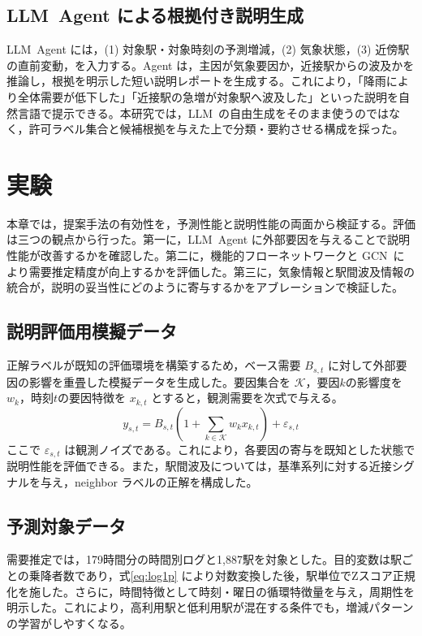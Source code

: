 \documentclass[technicalreport]{ieicej}
\newcommand{\LLM}{LLM}
\newcommand{\GCN}{GCN}
\begin{document}
\subsection{\LLM\ Agent による根拠付き説明生成}
\LLM\ Agent には，(1) 対象駅・対象時刻の予測増減，(2) 気象状態，(3) 近傍駅の直前変動，を入力する。Agent は，主因が気象要因か，近接駅からの波及かを推論し，根拠を明示した短い説明レポートを生成する。これにより，「降雨により全体需要が低下した」「近接駅の急増が対象駅へ波及した」といった説明を自然言語で提示できる。本研究では，\LLM\ の自由生成をそのまま使うのではなく，許可ラベル集合と候補根拠を与えた上で分類・要約させる構成を採った。

\section{実験}
本章では，提案手法の有効性を，予測性能と説明性能の両面から検証する。評価は三つの観点から行った。第一に，\LLM\ Agent に外部要因を与えることで説明性能が改善するかを確認した。第二に，機能的フローネットワークと \GCN\ により需要推定精度が向上するかを評価した。第三に，気象情報と駅間波及情報の統合が，説明の妥当性にどのように寄与するかをアブレーションで検証した。

\subsection{説明評価用模擬データ}
正解ラベルが既知の評価環境を構築するため，ベース需要 $B_{s,t}$ に対して外部要因の影響を重畳した模擬データを生成した。要因集合を $\mathcal{K}$，要因$k$の影響度を $w_k$，時刻$t$の要因特徴を $x_{k,t}$ とすると，観測需要を次式で与える。
\begin{equation}
y_{s,t}=B_{s,t}\left(1+\sum_{k\in\mathcal{K}}w_kx_{k,t}\right)+\varepsilon_{s,t}
\label{eq:synth}
\end{equation}
ここで $\varepsilon_{s,t}$ は観測ノイズである。これにより，各要因の寄与を既知とした状態で説明性能を評価できる。また，駅間波及については，基準系列に対する近接シグナルを与え，neighbor ラベルの正解を構成した。

\subsection{予測対象データ}
需要推定では，179時間分の時間別ログと1,887駅を対象とした。目的変数は駅ごとの乗降者数であり，式\eqref{eq:log1p} により対数変換した後，駅単位でZスコア正規化を施した。さらに，時間特徴として時刻・曜日の循環特徴量を与え，周期性を明示した。これにより，高利用駅と低利用駅が混在する条件でも，増減パターンの学習がしやすくなる。
\end{document}
